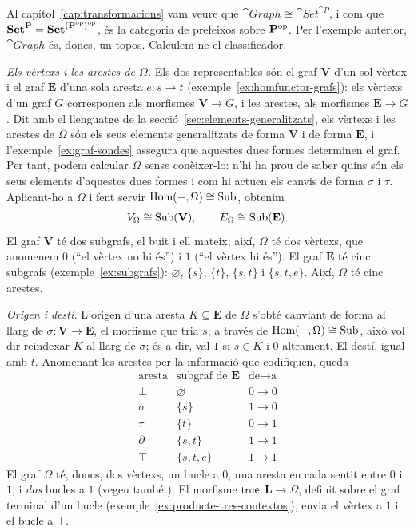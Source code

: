 \begin{exemple}\label{ex:omega-graph}
Al capítol~\ref{cap:transformacions} vam veure que $\cat{Graph}\cong\cat{Set}^{\cat{P}}$, i com que $\mathbf{Set}^{\mathbf{P}}=\mathbf{Set}^{(\mathbf{P}^{\mathrm{op}})^{\mathrm{op}}}$, és la categoria de prefeixos sobre $\mathbf{P}^{\mathrm{op}}$. Per l'exemple anterior, $\cat{Graph}$ és, doncs, un topos. Calculem-ne el classificador.

\emph{Els vèrtexs i les arestes de $\Omega$.} Els dos representables són el graf $\mathbf V$ d'un sol vèrtex i el graf $\mathbf E$ d'una sola aresta $e\colon s\to t$ (exemple~\ref{ex:homfunctor-grafs}): els vèrtexs d'un graf $G$ corresponen als morfismes $\mathbf V\to G$, i les arestes, als morfismes $\mathbf E\to G$. Dit amb el llenguatge de la secció~\ref{sec:elements-generalitzats}, els vèrtexs i les arestes de $\Omega$ són els seus elements generalitzats de forma $\mathbf V$ i de forma $\mathbf E$, i l'exemple~\ref{ex:graf-sondes} assegura que aquestes dues formes determinen el graf. Per tant, podem calcular $\Omega$ sense conèixer-lo: n'hi ha prou de saber quins són els seus elements d'aquestes dues formes i com hi actuen els canvis de forma $\sigma$ i $\tau$. Aplicant-ho a $\Omega$ i fent servir $\operatorname{Hom}(-,\Omega)\cong\operatorname{Sub}$, obtenim
\[
V_\Omega\cong\operatorname{Sub}(\mathbf V),\qquad E_\Omega\cong\operatorname{Sub}(\mathbf E).
\]
El graf $\mathbf V$ té dos subgrafs, el buit i ell mateix; així, $\Omega$ té dos vèrtexs, que anomenem $0$ (\enquote{el vèrtex no hi és}) i $1$ (\enquote{el vèrtex hi és}). El graf $\mathbf E$ té cinc subgrafs (exemple~\ref{ex:subgrafs}): $\varnothing$, $\{s\}$, $\{t\}$, $\{s,t\}$ i $\{s,t,e\}$. Així, $\Omega$ té cinc arestes.

\emph{Origen i destí.} L'origen d'una aresta $K\subseteq\mathbf E$ de $\Omega$ s'obté canviant de forma al llarg de $\sigma\colon\mathbf V\to\mathbf E$, el morfisme que tria $s$; a través de $\operatorname{Hom}(-,\Omega)\cong\operatorname{Sub}$, això vol dir reindexar $K$ al llarg de $\sigma$; és a dir, val $1$ si $s\in K$ i $0$ altrament. El destí, igual amb $t$. Anomenant les arestes per la informació que codifiquen, queda
\[
\renewcommand{\arraystretch}{1.2}
\begin{array}{c|c|l}
\text{aresta} & \text{subgraf de }\mathbf E & \text{de}\to\text{a}\\ \hline
\bot & \varnothing & 0\to0\\
\sigma & \{s\} & 1\to0\\
\tau & \{t\} & 0\to1\\
\partial & \{s,t\} & 1\to1\\
\top & \{s,t,e\} & 1\to1
\end{array}
\]
El graf $\Omega$ té, doncs, dos vèrtexs, un bucle a $0$, una aresta en cada sentit entre $0$ i $1$, i \emph{dos} bucles a $1$ (vegeu també \cite[exemple~15.4.3]{barrwells}). El morfisme $\mathsf{true}\colon\mathbf L\to\Omega$, definit sobre el graf terminal d'un bucle (exemple~\ref{ex:producte-tres-contextos}), envia el vèrtex a $1$ i el bucle a $\top$.


\end{exemple}
